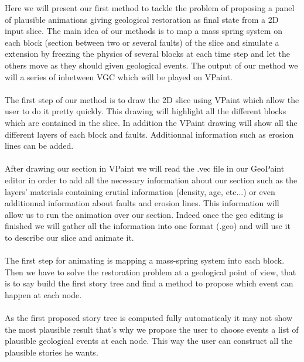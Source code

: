 \documentclass[12pt, a4paper]{memoir} %
\begin{document}
Here we will present our first method to tackle the problem of proposing a panel of plausible animations giving geological restoration as final state from a 2D input slice. 
The main idea of our methods is to map a mass spring system on each block (section between two or several faults) of the slice and simulate a extension by freezing the physics of several blocks at each time step and let the others move as they should given geological events. The output of our method we will a series of inbetween VGC which will be played on VPaint.\\\\
The first step of our method is to draw the 2D slice using VPaint which allow the user to do it pretty quickly.
This drawing will highlight all the different blocks which are contained in the slice.
In addition the VPaint drawing will show all the different layers of each block and faults. Additionnal information such as erosion lines can be added. \\\\
After drawing our section in VPaint we will read the .vec file in our GeoPaint editor in order to add all the necessary information about our section such as the layers' materials containing crutial information (density, age, etc...) or even  additionnal information about faults and erosion lines. This information will allow us to run the animation over our section.
Indeed once the geo editing is finished we will gather all the information into one format (.geo) and will use it to describe our slice and animate it.\\\\
The first step for animating is mapping a mass-spring system into each block. Then we have to solve the restoration problem at a geological point of view, that is to say build the first story tree and find a method to propose which event can happen at each node.\\\\
As the first proposed story tree is computed fully automaticaly it may not show the most plausible result that's why we propose the user to choose events a list of plausible geological events at each node.
This way the user can construct all the plausible stories he wants.
\end{document}
